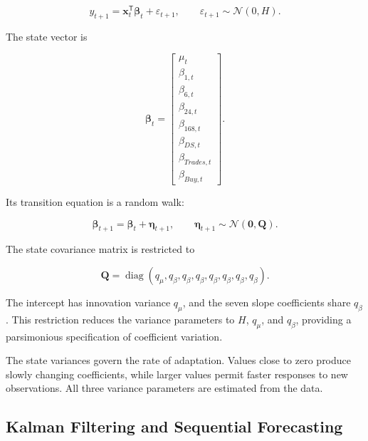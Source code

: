 \begin{equation}
y_{t+1}
=
\mathbf{x}_t^{\mathsf{T}}
\boldsymbol{\beta}_t
+
\varepsilon_{t+1},
\qquad
\varepsilon_{t+1}
\sim
\mathcal{N}(0,H).
\label{eq:tvp-observation}
\end{equation}

The state vector is

\begin{equation}
\boldsymbol{\beta}_t
=
\begin{bmatrix}
\mu_t \\
\beta_{1,t} \\
\beta_{6,t} \\
\beta_{24,t} \\
\beta_{168,t} \\
\beta_{DS,t} \\
\beta_{Trades,t} \\
\beta_{Buy,t}
\end{bmatrix}.
\label{eq:tvp-state-vector}
\end{equation}

Its transition equation is a random walk:

\begin{equation}
\boldsymbol{\beta}_{t+1}
=
\boldsymbol{\beta}_t
+
\boldsymbol{\eta}_{t+1},
\qquad
\boldsymbol{\eta}_{t+1}
\sim
\mathcal{N}
\left(
\mathbf{0},
\mathbf{Q}
\right).
\label{eq:tvp-state-transition}
\end{equation}

The state covariance matrix is restricted to

\begin{equation}
\mathbf{Q}
=
\operatorname{diag}
\left(
q_{\mu},
q_{\beta},
q_{\beta},
q_{\beta},
q_{\beta},
q_{\beta},
q_{\beta},
q_{\beta}
\right).
\label{eq:tvp-state-covariance}
\end{equation}

The intercept has innovation variance \(q_{\mu}\), and the
seven slope coefficients share \(q_{\beta}\). This restriction
reduces the variance parameters to \(H\), \(q_{\mu}\), and
\(q_{\beta}\), providing a parsimonious specification of
coefficient variation.

The state variances govern the rate of adaptation. Values close
to zero produce slowly changing coefficients, while larger
values permit faster responses to new observations. All three
variance parameters are estimated from the data.

\subsection{Kalman Filtering and Sequential Forecasting}

